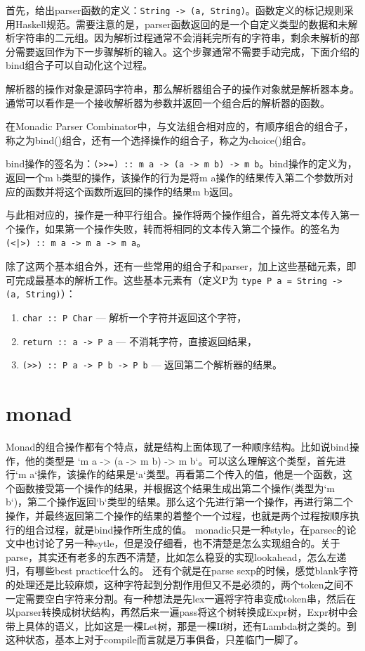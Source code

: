 首先，给出parser函数的定义：\texttt{String -> (a, String)}。函数定义的标记规则采用Haskell规范。需要注意的是，parser函数返回的是一个自定义类型的数据和未解析字符串的二元组。因为解析过程通常不会消耗完所有的字符串，剩余未解析的部分需要返回作为下一步骤解析的输入。这个步骤通常不需要手动完成，下面介绍的bind组合子可以自动化这个过程。

解析器的操作对象是源码字符串，那么解析器组合子的操作对象就是解析器本身。通常可以看作是一个接收解析器为参数并返回一个组合后的解析器的函数。

在Monadic Parser Combinator中，与文法组合相对应的，有顺序组合的组合子，称之为bind(\hsbind)组合，还有一个选择操作的组合子，称之为choice(\hschoice)组合。

bind操作的签名为：\texttt{(>>=) :: m a -> (a -> m b) -> m b}。bind操作的定义为，返回一个m b类型的操作，该操作的行为是将m a操作的结果传入第二个参数所对应的函数并将这个函数所返回的操作的结果m b返回。

与此相对应的，\hschoice{}操作是一种平行组合。\hschoice{}操作将两个操作组合，首先将文本传入第一个操作，如果第一个操作失败，转而将相同的文本传入第二个操作。\hschoice{}的签名为\texttt{(<|>) :: m a -> m a -> m a}。

除了这两个基本组合外，还有一些常用的组合子和parser，加上这些基础元素，即可完成最基本的解析工作。这些基本元素有（定义P为 \texttt{type P a = String -> (a, String)}）：

\begin{enumerate}
\item \texttt{char :: P Char} --- 解析一个字符并返回这个字符，
\item \texttt{return :: a -> P a}  --- 不消耗字符，直接返回结果，
\item \texttt{(>>) :: P a -> P b -> P b} --- 返回第二个解析器的结果。
\end{enumerate}

\section{monad}

Monad的组合操作都有个特点，就是结构上面体现了一种顺序结构。比如说bind操作，他的类型是 `m a -> (a -> m b) -> m b`。可以这么理解这个类型，首先进行`m a`操作，该操作的结果是`a`类型。再看第二个传入的值，他是一个函数，这个函数接受第一个操作的结果，并根据这个结果生成出第二个操作(类型为`m b`)，第二个操作返回`b`类型的结果。那么这个先进行第一个操作，再进行第二个操作，并最终返回第二个操作的结果的着整个一个过程，也就是两个过程按顺序执行的组合过程，就是bind操作所生成的值。
monadic只是一种style，在parsec的论文中也讨论了另一种sytle，但是没仔细看，也不清楚是怎么实现组合的。关于parse，其实还有老多的东西不清楚，比如怎么稳妥的实现lookahead，怎么左递归，有哪些best practice什么的。
还有个就是在parse sexp的时候，感觉blank字符的处理还是比较麻烦，这种字符起到分割作用但又不是必须的，两个token之间不一定需要空白字符来分割。有一种想法是先lex一遍将字符串变成token串，然后在以parser转换成树状结构，再然后来一遍pass将这个树转换成Expr树，Expr树中会带上具体的语义，比如这是一棵Let树，那是一棵If树，还有Lambda树之类的。到这种状态，基本上对于compile而言就是万事俱备，只差临门一脚了。

